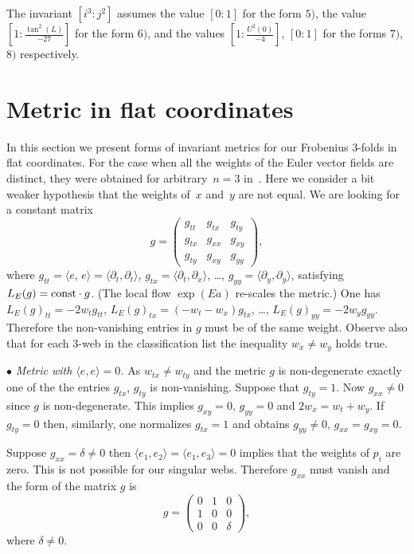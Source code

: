\documentclass[pdftex]{sigma}
\begin{document}
\begin{remark} The invariant $\left[i^3:j^2\right]$ assumes the value $\left[0:1\right]$ for the form $5)$,
the value $\left[1:\frac{\tan^2(L)}{-27}\right]$ for the form $6)$,
and the values $\left[1:\frac{U^2(0)}{-4}\right]$, $\left[0:1\right]$ for the forms $7)$, $8)$ respectively.
\end{remark}

\section{Metric in f\/lat coordinates}
In this section we present forms of invariant metrics for our Frobenius $3$-folds in f\/lat coordinates.
For the case when all the weights of the Euler vector f\/ields are distinct,
they were obtained for arbitrary~$n=3$ in~\cite{Df}.
Here we consider a bit weaker hypothesis that the weights of~$x$ and~$y$ are not equal.
We are looking for a constant matrix
\[g=
\begin{pmatrix}
g_{tt}&g_{tx}&g_{ty}\\
g_{tx}&g_{xx}&g_{xy}\\
g_{ty}&g_{xy}&g_{yy}
\end{pmatrix},
\]
where $g_{tt}=\langle e$, $e\rangle=\langle\partial_t,\partial_t\rangle$,
$g_{tx}=\langle\partial_t,\partial_x\rangle $, \dots, $g_{yy}=\langle\partial_y,\partial_y\rangle $, satisfying
$L_E(g)={\rm const}\cdot g$. (The local f\/low $\exp(Ea)$ re-scales the metric.)
One has $L_E(g)_{tt}=-2w_tg_{tt}$, $L_E(g)_{tx}=(-w_t-w_x)g_{tx}$, \dots, $L_E(g)_{yy}=-2w_yg_{yy}$.
Therefore the non-vanishing entries in $g$ must be of the same weight.
Observe also that for each $3$-web in the classif\/ication list the inequality $w_x\ne w_y$ holds true.

$\bullet$ {\it Metric with $\langle e,e\rangle=0$.}
As $w_{tx}\ne w_{ty}$ and the metric $g$ is non-degenerate exactly one of the the entries $g_{tx}$, $g_{ty}$
is non-vanishing. Suppose that $g_{ty}=1$. Now $g_{xx}\ne 0$ since $g$ is non-degenerate.
This implies $g_{xy}=0$, $g_{yy}=0$ and $2w_x=w_t+w_y$.
If $g_{ty}=0$ then, similarly, one normalizes $g_{tx}=1$ and obtains $g_{yy}\ne 0$, $g_{xx}=g_{xy}=0$.

Suppose $g_{xx}=\delta\ne 0$ then $\langle e_1,e_2\rangle =\langle e_1,e_3\rangle =0$ implies that the weights of $p_i$ are zero. This is not possible for our singular webs. Therefore $g_{xx}$ must vanish and the form of the matrix $g$ is
\begin{equation}\label{metric0}
g=
\begin{pmatrix}
0 & 1 & 0\\
1 & 0 & 0\\
0 & 0 & \delta
\end{pmatrix},
\end{equation}
where $\delta \ne 0$.
\end{document}
